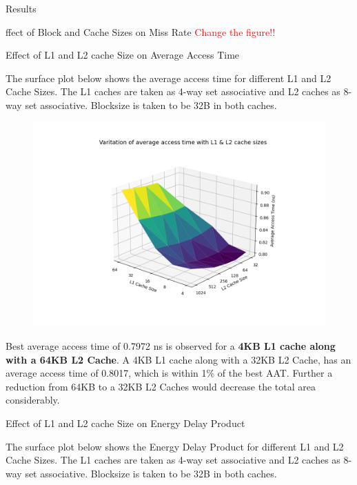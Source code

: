 \begin{section}{Results}
\begin{subsection}{ffect of Block and Cache Sizes on Miss Rate \textcolor{red}{Change the figure!!}}
        
    \end{subsection}

    \newpage

    \begin{subsection}{Effect of L1 and L2 cache Size on Average Access Time}

    The surface plot below shows the average access time for different L1 and L2 Cache Sizes. The L1 caches are taken as 4-way set associative and L2 caches as 8-way set associative. Blocksize is taken to be 32B in both caches.

    \begin{figure}[h]
        \includegraphics[width=\textwidth]{figures/fig5/fig5.png}
        \centering
        \label{fig:fig5}
    \end{figure}

    Best average access time of 0.7972 ns is observed for a \textbf{4KB L1 cache along with a 64KB L2 Cache}. A 4KB L1 cache along with a 32KB L2 Cache, has an average access time of 0.8017, which is within 1\% of the best AAT. Further a reduction from 64KB to a 32KB L2 Caches would decrease the total area considerably.
    
    \end{subsection}

    \newpage
    \begin{subsection}{Effect of L1 and L2 cache Size on Energy Delay Product}

        The surface plot below shows the Energy Delay Product for different L1 and L2 Cache Sizes. The L1 caches are taken as 4-way set associative and L2 caches as 8-way set associative. Blocksize is taken to be 32B in both caches.
    

\end{subsection}
\end{section}
